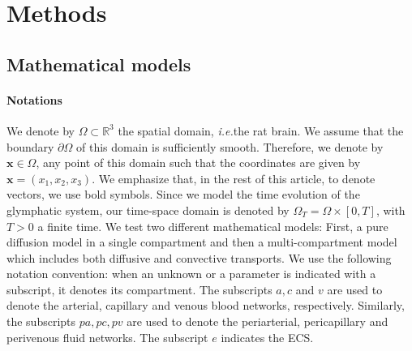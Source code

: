 \documentclass[10pt]{article}
\newcommand{\ie}{\emph{i.e.}\;}
\newcommand{\1}{^{(1)}}
\newcommand{\2}{^{(2)}}
\newcommand{\R}{\mathbb{R}}
\newcommand {\p}   {\partial}
\newcommand {\x}   {\mathbf{x}}
\begin{document}
\section{Methods}
\label{sec:method}
\subsection{Mathematical models}
\paragraph{Notations} We denote by $\Omega \subset \R^3$ the spatial domain, \ie the rat brain. We assume that the boundary $\p \Omega$  of this domain is sufficiently smooth. Therefore, we denote by $\x \in \Omega$, any point of this domain such that the coordinates are given by $\x =(x_1,x_2,x_3)$. We emphasize that, in the rest of this article, to denote vectors, we use bold symbols. Since we model the time evolution of the glymphatic system, our time-space domain is denoted by $\Omega_T = \Omega \times [0,T]$, with $T> 0$ a finite time. We test two different mathematical models: First, a pure diffusion model in a single compartment and then a multi-compartment model which includes both diffusive and convective transports. We use the following notation convention: when an unknown or a parameter is indicated with a subscript, it denotes its compartment. The subscripts $a,c$ and $v$ are used to denote the arterial, capillary and venous blood networks, respectively. Similarly, the subscripts $pa, pc, pv$ are used to denote the periarterial, pericapillary and perivenous fluid networks. The subscript $e$ indicates the ECS.
\end{document}

